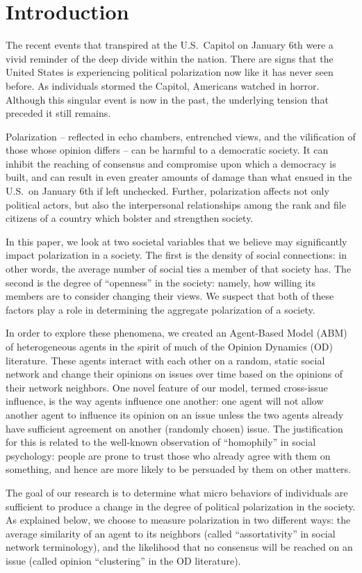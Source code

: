 \section{Introduction}

The recent events that transpired at the U.S.~Capitol on January 6th were a
vivid reminder of the deep divide within the nation. There are signs that the
United States is experiencing political polarization now like it has never seen
before. As individuals stormed the Capitol, Americans watched in horror.
Although this singular event is now in the past, the underlying tension that
preceded it still remains.

Polarization -- reflected in echo chambers, entrenched views, and the
vilification of those whose opinion differs -- can be harmful to a democratic
society. It can inhibit the reaching of consensus and compromise upon which a
democracy is built, and can result in even greater amounts of damage than what
ensued in the U.S.~on January 6th if left unchecked. Further, polarization
affects not only political actors, but also the interpersonal relationships
among the rank and file citizens of a country which bolster and strengthen
society.

In this paper, we look at two societal variables that we believe may
significantly impact polarization in a society. The first is the density of
social connections: in other words, the average number of social ties a member
of that society has. The second is the degree of ``openness'' in the society:
namely, how willing its members are to consider changing their views. We
suspect that both of these factors play a role in determining the aggregate
polarization of a society.

In order to explore these phenomena, we created an Agent-Based Model (ABM) of
heterogeneous agents in the spirit of much of the Opinion Dynamics (OD)
literature. These agents interact with each other on a random, static social
network and change their opinions on issues over time based on the opinions of
their network neighbors. One novel feature of our model, termed cross-issue influence,
is the way agents influence one another: one agent will not allow another agent to influence its
opinion on an issue unless the two agents already have sufficient agreement on
another (randomly chosen) issue. The justification for this is related to the
well-known observation of ``homophily'' in social psychology: people are prone
to trust those who already agree with them on something, and hence are more
likely to be persuaded by them on other matters.

The goal of our research is to determine what micro behaviors of individuals
are sufficient to produce a change in the degree of political polarization in
the society. As explained below, we choose to measure polarization in two
different ways: the average similarity of an agent to its neighbors (called
``assortativity'' in social network terminology), and the likelihood that no
consensus will be reached on an issue (called opinion ``clustering'' in the OD
literature).
